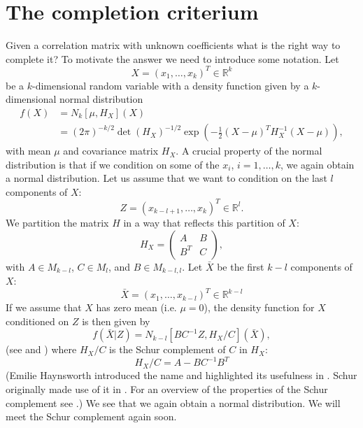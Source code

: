 \documentclass[11pt, a4paper]{article}
\newcommand{\R}{\mathbb{R}}
\begin{document}
\section{The completion criterium}\label{sec.criterium}
Given a correlation matrix with unknown coefficients what is the right way to complete it? To motivate the answer we need to introduce some notation. Let 
\begin{equation}
	X = ( x_1, \ldots, x_k )^T\in \R^k
\end{equation}
be a $k$-dimensional random variable with a density function given by a $k$-dimensional normal distribution
\begin{align}
	f(X) & = N_k[\mu, H_X]( X ) \\
	& = (2\pi)^{-k/2}\det(H_X)^{-1/2}\exp\left(-\frac{1}{2}(X -\mu)^T H_X^{-1} (X-\mu)\right),
\end{align}
with mean $\mu$ and covariance matrix $H_X$. A crucial property of the normal distribution is that if we condition on some of the $x_i$, $i=1, \dots, k$, we again obtain a normal distribution. Let us assume that we want to condition on the last $l$ components of $X$:
\begin{equation}
	Z = (x_{k-l+1}, \ldots, x_k)^T \in \R^l.
\end{equation}
We partition the matrix $H$ in a way that reflects this partition of $X$:
\begin{equation}
	H_X = \begin{pmatrix}
		A & B \\
		B^T & C
	\end{pmatrix},
\end{equation}
with $A\in M_{k-l}$, $C\in M_l$, and $B\in M_{k-l,l}$. Let $\bar X$ be the first $k-l$ components of $X$:
\begin{equation}
	\bar X = (x_1, \ldots, x_{k-l})^T\in \R^{k-l}
\end{equation}
If we assume that $X$ has zero mean (i.e. $\mu=0$), the density function for $X$ conditioned on $Z$ is then given by
\begin{equation}
	f(\bar X \vert Z ) = N_{k-l}[BC^{-1}Z, H_X/C ](\bar X),
\end{equation}
(see \cite[chapter 8]{rao} and \cite{cottle}) where $H_X/C$ is the Schur complement of $C$ in $H_X$:
\begin{equation}\label{eqn.hxc}
	H_X/C = A - B C^{-1}B^T
\end{equation}
(Emilie Haynsworth introduced the name and highlighted its usefulness in \cite{hayns}. Schur originally made use of it in \cite{schur}. For an overview of the properties of the Schur complement see \cite{horn}.) We see that we again obtain a normal distribution. We will meet the Schur complement again soon.
\end{document}
